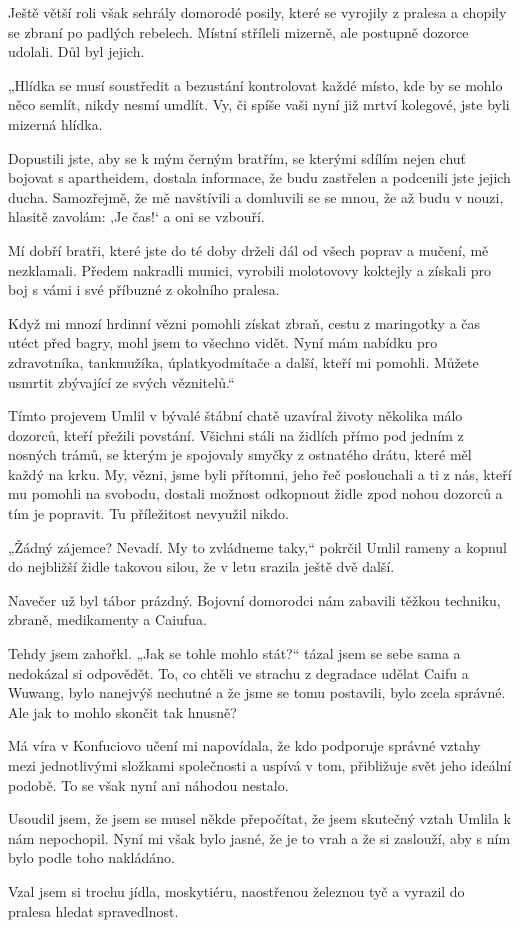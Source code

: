 Ještě větší roli však sehrály domorodé posily, které se vyrojily z pralesa a chopily se zbraní po padlých rebelech. Místní stříleli mizerně, ale postupně dozorce udolali. Důl byl jejich.

„Hlídka se musí soustředit a bezustání kontrolovat každé místo, kde by se mohlo něco semlít, nikdy nesmí umdlít. Vy, či spíše vaši nyní již mrtví kolegové, jste byli mizerná hlídka.

Dopustili jste, aby se k mým černým bratřím, se kterými sdílím nejen chuť bojovat s apartheidem, dostala informace, že budu zastřelen a podcenili jste jejich ducha. Samozřejmě, že mě navštívili a domluvili se se mnou, že až budu v nouzi, hlasitě zavolám: ‚Je čas!‘ a oni se vzbouří.

Mí dobří bratři, které jste do té doby drželi dál od všech poprav a mučení, mě nezklamali. Předem nakradli munici, vyrobili molotovovy koktejly a získali pro boj s vámi i své příbuzné z okolního pralesa.

Když mi mnozí hrdinní vězni pomohli získat zbraň, cestu z maringotky a čas utéct před bagry, mohl jsem to všechno vidět. Nyní mám nabídku pro zdravotníka, tankmužíka, úplatkyodmítače a další, kteří mi pomohli. Můžete usmrtit zbývající ze svých věznitelů.“

Tímto projevem Umlil v bývalé štábní chatě uzavíral životy několika málo dozorců, kteří přežili povstání. Všichni stáli na židlích přímo pod jedním z nosných trámů, se kterým je spojovaly smyčky z ostnatého drátu, které měl každý na krku. My, vězni, jsme byli přítomni, jeho řeč poslouchali a ti z nás, kteří mu pomohli na svobodu, dostali možnost odkopnout židle zpod nohou dozorců a tím je popravit. Tu příležitost nevyužil nikdo.
 
„Žádný zájemce? Nevadí. My to zvládneme taky,“ pokrčil Umlil rameny a kopnul do nejbližší židle takovou silou, že v letu srazila ještě dvě další.

Navečer už byl tábor prázdný. Bojovní domorodci nám zabavili těžkou techniku, zbraně, medikamenty a Caiufua. 

Tehdy jsem zahořkl. „Jak se tohle mohlo stát?“ tázal jsem se sebe sama a nedokázal si odpovědět. To, co chtěli ve strachu z degradace udělat Caifu a Wuwang, bylo nanejvýš nechutné a že jsme se tomu postavili, bylo zcela správné. Ale jak to mohlo skončit tak hnusně?

Má víra v Konfuciovo učení mi napovídala, že kdo podporuje správné vztahy mezi jednotlivými složkami společnosti a uspívá v tom, přibližuje svět jeho ideální podobě. To se však nyní ani náhodou nestalo.
 
 Usoudil jsem, že jsem se musel někde přepočítat, že jsem skutečný vztah Umlila k nám nepochopil. Nyní mi však bylo jasné, že je to vrah a že si zaslouží, aby s ním bylo podle toho nakládáno.
 
Vzal jsem si trochu jídla, moskytiéru, naostřenou železnou tyč a vyrazil do pralesa hledat spravedlnost.

